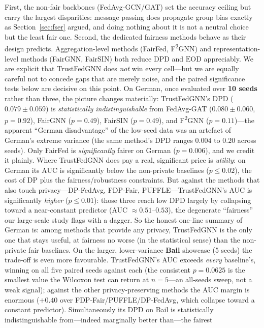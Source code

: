 \documentclass[pdflatex,sn-mathphys-num]{sn-jnl}
\theoremstyle{thmstyleone}%
\theoremstyle{thmstyletwo}%
\theoremstyle{thmstylethree}%
\newcommand{\dpd}{\mathrm{DPD}}
\newcommand{\eod}{\mathrm{EOD}}
\begin{document}
First, the non-fair backbones (FedAvg-GCN/GAT) set the accuracy ceiling but
carry the largest disparities: message passing does propagate group bias exactly
as Section~\ref{sec:fser} argued, and doing nothing about it is not a neutral
choice but the least fair one. Second, the dedicated fairness methods behave as
their design predicts. Aggregation-level methods (FairFed, F\textsuperscript{2}GNN)
and representation-level methods (FairGNN, FairSIN) both reduce $\dpd$ and
$\eod$ appreciably. We are explicit that TrustFedGNN does \emph{not} win every
cell---but we are equally careful not to concede gaps that are merely noise, and
the paired significance tests below are decisive on this point.
On German, once evaluated over \textbf{10 seeds} rather than three, the picture
changes materially: TrustFedGNN's DPD ($0.079\!\pm\!0.059$) is
\emph{statistically indistinguishable} from FedAvg-GAT ($0.080\!\pm\!0.060$,
$p{=}0.92$), FairGNN ($p{=}0.49$), FairSIN ($p{=}0.49$), and F\textsuperscript{2}GNN
($p{=}0.11$)---the apparent ``German disadvantage'' of the low-seed data was an
artefact of German's extreme variance (the same method's DPD ranges $0.004$ to
$0.20$ across seeds). Only FairFed is \emph{significantly} fairer on German
($p{=}0.006$), and we credit it plainly. Where TrustFedGNN does pay a real,
significant price is \emph{utility}: on German its AUC is significantly below the
non-private baselines ($p{\le}0.02$), the cost of DP plus the fairness/robustness
constraints. But against the methods that also touch privacy---DP-FedAvg,
FDP-Fair, PUFFLE---TrustFedGNN's AUC is significantly \emph{higher} ($p{\le}0.01$):
those three reach low DPD largely by collapsing toward a near-constant predictor
(AUC $\approx 0.51$--$0.53$), the degenerate ``fairness'' our large-scale study
flags with a dagger. So the honest one-line summary of German is: among methods
that provide any privacy, TrustFedGNN is the only one that stays useful, at
fairness no worse (in the statistical sense) than the non-private fair baselines.
On the larger, lower-variance \textbf{Bail} showcase (5 seeds) the trade-off is
even more favourable. TrustFedGNN's AUC exceeds \emph{every} baseline's, winning
on all five paired seeds against each (the consistent $p{=}0.0625$ is the
smallest value the Wilcoxon test can return at $n{=}5$---an all-seeds sweep, not
a weak signal); against the other privacy-preserving methods the AUC margin is
enormous ($+0.40$ over FDP-Fair/PUFFLE/DP-FedAvg, which collapse toward a
constant predictor). Simultaneously its DPD on Bail is statistically
indistinguishable from---indeed marginally better than---the fairest
\end{document}
